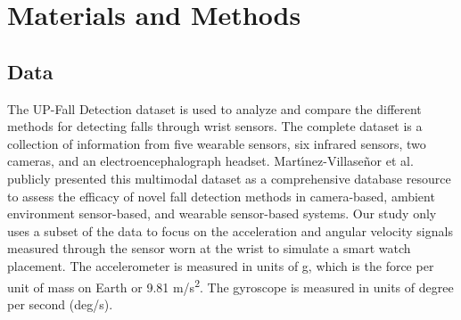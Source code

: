 \documentclass{llncs}
\begin{document}

    
\section{Materials and Methods}

\subsection{Data}

The UP-Fall Detection dataset is used to analyze and compare the different methods for detecting falls through wrist sensors. The complete dataset is a collection of information from five wearable sensors, six infrared sensors, two cameras, and an electroencephalograph headset. Mart{\'\i}nez-Villase{\~n}or et al. publicly presented this multimodal dataset as a comprehensive database resource to assess the efficacy of novel fall detection methods in camera-based, ambient environment sensor-based, and wearable sensor-based systems.\cite{martinez2019up} Our study only uses a subset of the data to focus on the acceleration and angular velocity signals measured through the sensor worn at the wrist to simulate a smart watch placement. The accelerometer is measured in units of g, which is the force per unit of mass on Earth or 9.81 m/s\textsuperscript{2}. The gyroscope is measured in units of degree per second (deg/s).
 
\end{document}

